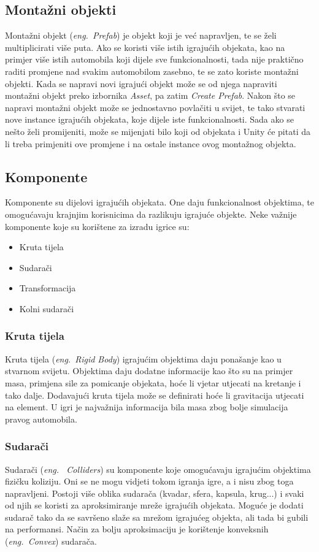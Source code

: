 \subsection{Montažni objekti}
Montažni objekt (\emph{eng.~Prefab}) je objekt koji je već napravljen, te se želi multiplicirati više puta. Ako se koristi više istih igrajućih objekata, kao na primjer više istih automobila koji dijele sve funkcionalnosti, tada nije praktično raditi promjene nad svakim automobilom zasebno, te se zato koriste montažni objekti. Kada se napravi novi igrajući objekt može se od njega napraviti montažni objekt preko izbornika \emph{Asset}, pa zatim \emph{Create Prefab}. Nakon što se napravi montažni objekt može se jednostavno povlačiti u svijet, te tako stvarati nove instance igrajućih objekata, koje dijele iste funkcionalnosti. Sada ako se nešto želi promijeniti, može se mijenjati bilo koji od objekata i Unity će pitati da li treba primjeniti ove promjene i na ostale instance ovog montažnog objekta.

\subsection{Komponente}
Komponente su dijelovi igrajućih objekata. One daju funkcionalnost objektima, te omogućavaju krajnjim korisnicima da razlikuju igrajuće objekte. Neke važnije komponente koje su korištene za izradu igrice su:

\begin{itemize} 
	\item Kruta tijela
	\item Sudarači
	\item Transformacija
	\item Kolni sudarači 
\end{itemize}

\subsubsection{Kruta tijela}
Kruta tijela (\emph{eng.~Rigid Body}) igrajućim objektima daju ponašanje kao u stvarnom svijetu. Objektima daju dodatne informacije kao što su na primjer masa, primjena sile za pomicanje objekata, hoće li vjetar utjecati na kretanje i tako dalje. Dodavajući kruta tijela može se definirati hoće li gravitacija utjecati na element. U igri je najvažnija informacija bila masa zbog bolje simulacija pravog automobila.
\subsubsection{Sudarači}
Sudarači (\emph{eng.~ Colliders}) su komponente koje omogućavaju igrajućim objektima fizičku koliziju. Oni se ne mogu vidjeti tokom igranja igre, a i nisu zbog toga napravljeni. Postoji više oblika sudarača (kvadar, sfera, kapsula, krug...) i svaki od njih se koristi za aproksimiranje mreže igrajućih objekata. Moguće je dodati sudarač tako da se savršeno slaže sa mrežom igrajućeg objekta, ali tada bi gubili na performansi. Način za bolju aproksimaciju je korištenje konveksnih (\emph{eng.~Convex}) sudarača.


